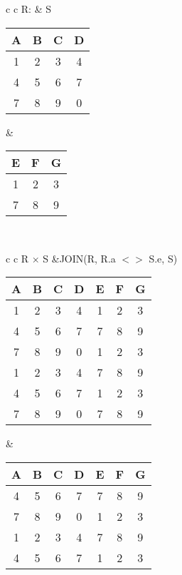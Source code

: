 \begin{tabular}{ c c}
	R: & S \\
	\begin{tabular}{|c|c|c|c|}
		\hline
		A & B & C & D\\
		\hline
		1 & 2 & 3 & 4\\
		\hline
		4 & 5 & 6 & 7\\
		\hline
		7 & 8 & 9 & 0\\
		\hline
	\end{tabular} &

	\begin{tabular}{|c|c|c|}
		\hline
		E & F & G \\
		\hline
		1 & 2 & 3\\
		\hline
		7 & 8 & 9\\
		\hline
	\end{tabular}
\end{tabular}\\

\hspace{-0.5cm}
\begin{tabular}{ c c}
	R $\times$ S &JOIN(R, R.a $<>$ S.e, S)\\
	\begin{tabular}{|c|c|c|c|c|c|c|}
		\hline
		A & B & C & D & E & F & G\\
		\hline
		1 & 2 & 3 & 4 & 1 & 2 & 3\\
		\hline
		4 & 5 & 6 & 7 & 7 & 8 & 9\\
		\hline
		7 & 8 & 9 & 0 & 1 & 2 & 3\\
		\hline                     
		1 & 2 & 3 & 4 & 7 & 8 & 9\\
		\hline
		4 & 5 & 6 & 7 & 1 & 2 & 3\\
		\hline                     
		7 & 8 & 9 & 0 & 7 & 8 & 9\\
		\hline
	\end{tabular} &

	\begin{tabular}{|c|c|c|c|c|c|c|}
		\hline
		A & B & C & D & E & F & G\\
		\hline
		4 & 5 & 6 & 7 & 7 & 8 & 9\\
		\hline
		7 & 8 & 9 & 0 & 1 & 2 & 3\\
		\hline                     
		1 & 2 & 3 & 4 & 7 & 8 & 9\\
		\hline
		4 & 5 & 6 & 7 & 1 & 2 & 3\\
		\hline
	\end{tabular} 
\end{tabular}\\

